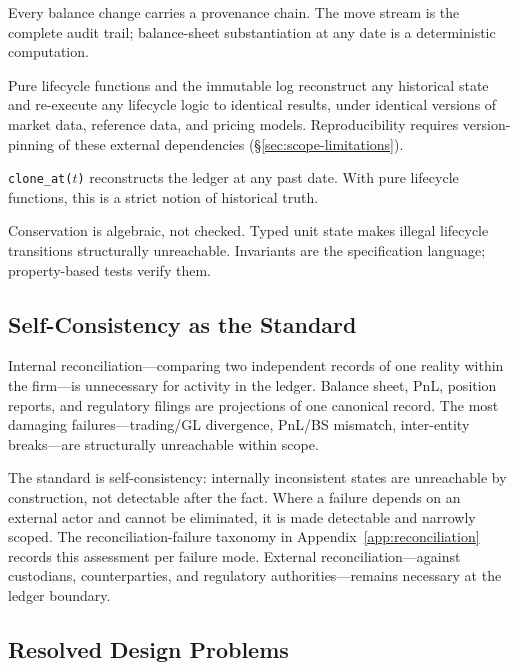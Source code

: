 \begin{description}[nosep]
\item[Auditability.] Every balance change carries a provenance chain. The move stream is the complete audit trail; balance-sheet substantiation at any date is a deterministic computation.
\item[Reproducibility.] Pure lifecycle functions and the immutable log reconstruct any historical state and re-execute any lifecycle logic to identical results, under identical versions of market data, reference data, and pricing models. Reproducibility requires version-pinning of these external dependencies (\S\ref{sec:scope-limitations}).
\item[Time travel.] \texttt{clone\_at($t$)} reconstructs the ledger at any past date. With pure lifecycle functions, this is a strict notion of historical truth.
\item[Encoded correctness.] Conservation is algebraic, not checked. Typed unit state makes illegal lifecycle transitions structurally unreachable. Invariants are the specification language; property-based tests verify them.
\end{description}

\subsection{Self-Consistency as the Standard}

Internal reconciliation---comparing two independent records of one reality within the firm---is unnecessary for activity in the ledger. Balance sheet, PnL, position reports, and regulatory filings are projections of one canonical record. The most damaging failures---trading/GL divergence, PnL/BS mismatch, inter-entity breaks---are structurally unreachable within scope.

The standard is self-consistency: internally inconsistent states are unreachable by construction, not detectable after the fact. Where a failure depends on an external actor and cannot be eliminated, it is made detectable and narrowly scoped. The reconciliation-failure taxonomy in Appendix~\ref{app:reconciliation} records this assessment per failure mode. External reconciliation---against custodians, counterparties, and regulatory authorities---remains necessary at the ledger boundary.

\subsection{Resolved Design Problems}

